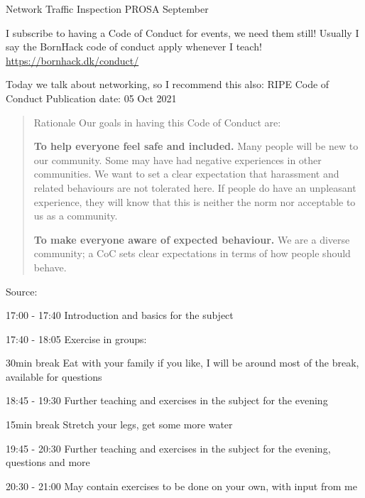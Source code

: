 \documentclass[Screen16to9,17pt]{foils}
\begin{document}
\mytitlepage
{Network Traffic Inspection}
{PROSA September \the\year{}}


\hlkprofiluk



I subscribe to having a Code of Conduct for events, we need them still! Usually I say the BornHack code of conduct apply whenever I teach! \url{https://bornhack.dk/conduct/}

Today we talk about networking, so I recommend this also:
RIPE Code of Conduct
Publication date: 05 Oct 2021

\begin{quote}
Rationale
Our goals in having this Code of Conduct are:
\begin{list2}
\item {\bf To help everyone feel safe and included.} Many people will be new to our community. Some may have had negative experiences in other communities. We want to set a clear expectation that harassment and related behaviours are not tolerated here. If people do have an unpleasant experience, they will know that this is neither the norm nor acceptable to us as a community.

\item {\bf To make everyone aware of expected behaviour.} We are a diverse community; a CoC sets clear expectations in terms of how people should behave.
\end{list2}
\end{quote}
Source: {\small
{}}


\begin{list2}
\item 17:00 - 17:40 Introduction and basics for the subject

\item 17:40 - 18:05 Exercise in groups:

\item 30min break Eat with your family if you like, I will be around most of the break, available for questions

\item 18:45 - 19:30 Further teaching and exercises in the subject for the evening

\item 15min break Stretch your legs, get some more water

\item 19:45 - 20:30
Further teaching and exercises in the subject for the evening, questions and more

\item 20:30 - 21:00 May contain exercises to be done on your own, with input from me
\end{list2}
\end{document}
